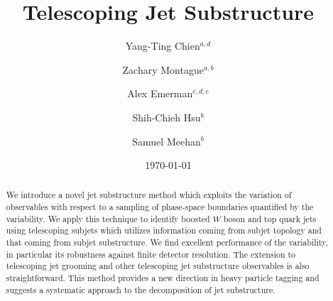 \documentclass[aps,prl,floatfix,preprintnumbers,twocolumn,groupedaddress,nofootinbib]{revtex4-1}
\begin{document}
\title{Telescoping Jet Substructure}

\author{Yang-Ting Chien$^{a,d}$}

\author{Zachary Montague$^{a,b}$}

\author{Alex Emerman$^{c,d,e}$}

\author{Shih-Chieh Hsu$^b$}

\author{Samuel Meehan$^b$}


\date{\today}
\linenumbers

\begin{abstract}
We introduce a novel jet substructure method which exploits the variation of observables with respect to a sampling of phase-space boundaries quantified by the variability. We apply this technique to identify boosted $W$ boson and top quark jets using telescoping subjets which utilizes information coming from subjet topology and that coming from subjet substructure. We find excellent performance of the variability, in particular its robustness against finite detector resolution. The extension to telescoping jet grooming and other telescoping jet substructure observables is also straightforward. This method provides a new direction in heavy particle tagging and suggests a systematic approach to the decomposition of jet substructure.
\end{abstract}
\maketitle
\end{document}
